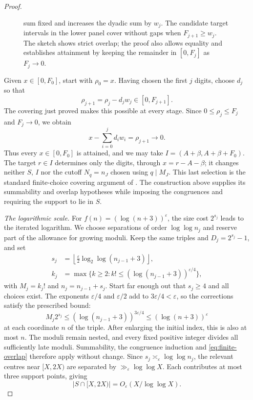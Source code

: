\documentclass[11pt]{article}
\begin{document}
\begin{proof}
\begin{figure}[t]
{sum fixed and increases the dyadic sum by $w_j$.  The candidate target
intervals in the lower panel cover without gaps when $F_{j+1}\ge w_j$.
The sketch shows strict overlap; the proof also allows equality and
establishes attainment by keeping the remainder in $[0,F_j]$ as $F_j\to0$.}
\label{fig:correction-and-overlap}
\end{figure}
Given $x\in[0,F_0]$, start with $\rho_0=x$.  Having chosen the first
$j$ digits, choose $d_j$ so that
\[
 \rho_{j+1}=\rho_j-d_jw_j\in[0,F_{j+1}].
\]
The covering just proved makes this possible at every stage.  Since $0\le\rho_j\le F_j$ and $F_j\to0$, we obtain
\[
 x-\sum_{i=0}^{j}d_iw_i=\rho_{j+1}\longrightarrow0.
\]
Thus every $x\in[0,F_0]$ is attained, and we may take
$I=(A+\beta,A+\beta+F_0)$.  The target $r\in I$ determines only the
digits, through $x=r-A-\beta$; it changes neither $S$, $I$ nor the
cutoff $N_q=n_J$ chosen using $q\mid M_J$.
This last selection is the standard finite-choice covering argument
of \cite[Lemma~4]{crmarickovac2025}.  The construction above supplies
its summability and overlap hypotheses while imposing the congruences
and requiring the support to lie in $S$.

\par\medskip\noindent\emph{The logarithmic scale.}
For $f(n)=(\log(n+3))^\varepsilon$, the size cost $2^{s_j}$ leads to
the iterated logarithm.  We choose separations of order $\log\log n_j$
and reserve part of the allowance for growing moduli.  Keep the same
triples and $D_j=2^{s_j}-1$, and set
\[
 \begin{aligned}
 s_j&=\left\lfloor\frac{\varepsilon}{2}
               \log_2\log(n_{j-1}+3)\right\rfloor,\\
 k_j&=\max\{k\ge2:k!\le(\log(n_{j-1}+3))^{\varepsilon/4}\},
 \end{aligned}
\]
with $M_j=k_j!$ and $n_j=n_{j-1}+s_j$.  Start far enough out that
$s_j\ge4$ and all choices exist.  The exponents $\varepsilon/4$ and
$\varepsilon/2$ add to $3\varepsilon/4<\varepsilon$, so the corrections
satisfy the prescribed bound:
\[
 M_j2^{s_j}\le(\log(n_{j-1}+3))^{3\varepsilon/4}
             \le(\log(n+3))^\varepsilon
\]
at each coordinate $n$ of the triple.  After enlarging the initial
index, this is also at most $n$.  The moduli remain nested, and every fixed positive integer divides all
sufficiently late moduli.  Summability, the congruence induction and
\eqref{eq:finite-overlap} therefore apply without change.  Since
$s_j\asymp_\varepsilon\log\log n_j$, the relevant centres near $[X,2X)$
are separated by $\gg_\varepsilon\log\log X$.  Each contributes at most
three support points, giving
\[
 |S\cap[X,2X)|=O_\varepsilon(X/\log\log X).
\]


\end{proof}
\end{document}
